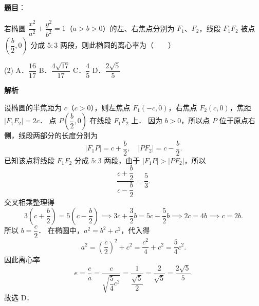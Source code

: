 \begin{answer}

\textbf{题目}：

若椭圆 $\dfrac{x^2}{a^2} + \dfrac{y^2}{b^2} = 1$（$a > b > 0$）的左、右焦点分别为 $F_1$、$F_2$，线段 $F_1F_2$ 被点 $\left(\dfrac{b}{2}, 0\right)$ 分成 $5 : 3$ 两段，则此椭圆的离心率为\mbox{（　　）}

\begin{gkopts}(2)
\task A．$\dfrac{16}{17}$
\task B．$\dfrac{4\sqrt{17}}{17}$
\task C．$\dfrac{4}{5}$
\task D．$\dfrac{2\sqrt{5}}{5}$
\end{gkopts}

\textbf{解析}

设椭圆的半焦距为 $c$（$c > 0$），则左焦点 $F_1(-c, 0)$，右焦点 $F_2(c, 0)$，焦距 $|F_1F_2| = 2c$．
点 $P\left(\dfrac{b}{2}, 0\right)$ 在线段 $F_1F_2$ 上．
因为 $b > 0$，所以点 $P$ 位于原点右侧，线段两部分的长度分别为
\nopagebreak[4]
\[
|F_1P| = c + \frac{b}{2}, \quad |PF_2| = c - \frac{b}{2}.
\]
已知该点将线段 $F_1F_2$ 分成 $5 : 3$ 两段，由于 $|F_1P| > |PF_2|$，所以
\nopagebreak[4]
\[
\frac{c + \dfrac{b}{2}}{c - \dfrac{b}{2}} = \frac{5}{3}.
\]
交叉相乘整理得
\nopagebreak[4]
\[
3\left(c + \frac{b}{2}\right) = 5\left(c - \frac{b}{2}\right) \implies 3c + \frac{3}{2}b = 5c - \frac{5}{2}b \implies 2c = 4b \implies c = 2b.
\]
所以 $b = \dfrac{c}{2}$．
在椭圆中，$a^2 = b^2 + c^2$，代入得
\nopagebreak[4]
\[
a^2 = \left(\frac{c}{2}\right)^2 + c^2 = \frac{c^2}{4} + c^2 = \frac{5}{4}c^2.
\]
因此离心率
\nopagebreak[4]
\[
e = \frac{c}{a} = \frac{c}{\sqrt{\dfrac{5}{4}c^2}} = \frac{1}{\dfrac{\sqrt{5}}{2}} = \frac{2}{\sqrt{5}} = \frac{2\sqrt{5}}{5}.
\]
故选 D．


\end{answer}
